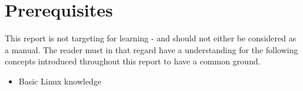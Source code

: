 \chapter*{Prerequisites}

This report is not targeting for learning - and should not either be considered as a manual. The reader must in that regard have a understanding for the following concepts introduced throughout this report to have a common ground.

\begin{itemize}
    \item Basic Linux knowledge 
    
\end{itemize}

\newpage